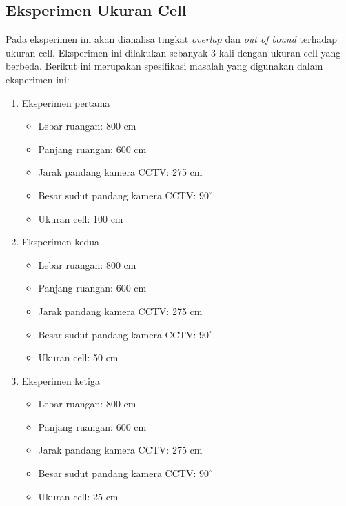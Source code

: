 \subsection{Eksperimen Ukuran Cell}
Pada eksperimen ini akan dianalisa tingkat \textit{overlap} dan \textit{out of bound} terhadap ukuran cell. Eksperimen ini dilakukan sebanyak 3 kali dengan ukuran cell yang berbeda. Berikut ini merupakan spesifikasi masalah yang digunakan dalam eksperimen ini:
\begin{enumerate}
	\item Eksperimen pertama
	\begin{itemize}
		\item Lebar ruangan: 800 cm
		\item Panjang ruangan: 600 cm
		\item Jarak pandang kamera CCTV: 275 cm
		\item Besar sudut pandang kamera CCTV: \(90^\circ\)
		\item Ukuran cell: 100 cm
	\end{itemize}
		
	\item Eksperimen kedua
	\begin{itemize}
		\item Lebar ruangan: 800 cm
		\item Panjang ruangan: 600 cm
		\item Jarak pandang kamera CCTV: 275 cm
		\item Besar sudut pandang kamera CCTV: \(90^\circ\)
		\item Ukuran cell: 50 cm
	\end{itemize}
		
	\item Eksperimen ketiga
	\begin{itemize}
		\item Lebar ruangan: 800 cm
		\item Panjang ruangan: 600 cm
		\item Jarak pandang kamera CCTV: 275 cm
		\item Besar sudut pandang kamera CCTV: \(90^\circ\)
		\item Ukuran cell: 25 cm
	\end{itemize}
\end{enumerate}
	
